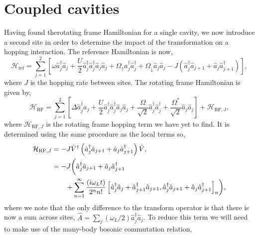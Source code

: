 \section{Coupled cavities}

Having found therotating frame Hamiltonian for a single cavity, we now introduce a second site in order to determine the impact of the transformation on a hopping interaction. The reference Hamiltonian is now,
\begin{equation}
	\mathcal{H}_{\mathrm{ref}} = \sum_{j=1}^{2}\left[\omega\hat{a}_{j}^{\dagger}\hat{a}_{j} + \frac{U}{2}\hat{a}_{j}^{\dagger}\hat{a}_{j}^{\dagger}\hat{a}_{j}\hat{a}_{j} + \Omega_{\uparrow}\hat{a}_{j}^{\dagger}\hat{a}_{j}^{\dagger} + \Omega_{\downarrow}\hat{a}_{j}\hat{a}_{j} - J\left(\hat{a}_{j}^{\dagger}\hat{a}_{j+1} + \hat{a}_{j}\hat{a}_{j+1}^{\dagger} \right) \right],
	\label{eq:rot23}
\end{equation}
where \(J\) is the hopping rate between sites. The rotating frame Hamiltonian is given by,
\begin{equation}
	\mathcal{H}_{\mathrm{RF}} = \sum_{j=1}^{2} \left[ \Delta\hat{a}_{j}^{\dagger}\hat{a}_{j} + \frac{U}{2}\hat{a}_{j}^{\dagger}\hat{a}_{j}^{\dagger}\hat{a}_{j}\hat{a}_{j} + \frac{\Omega}{\sqrt{2}}\hat{a}_{j}^{\dagger}\hat{a}_{j}^{\dagger} + \frac{\Omega^{*}}{\sqrt{2}}\hat{a}_{j}\hat{a}_{j} \right] + \mathcal{H}_{\mathrm{RF},J},
	\label{eq:rot24}
\end{equation}
where \(\mathcal{H}_{\mathrm{RF},J}\) is the rotating frame hopping term we have yet to find. It is determined using the same procedure as the local terms so,
\begin{align}
	\mathcal{H}_{\mathrm{RF},J} &= -J\hat{V}^{\dagger}\left(\hat{a}_{j}^{\dagger}\hat{a}_{j+1} + \hat{a}_{j}\hat{a}_{j+1}^{\dagger}\right)\hat{V}, \notag \\
	&= -J\biggl(\hat{a}_{j}^{\dagger}\hat{a}_{j+1} + \hat{a}_{j}\hat{a}_{j+1}^{\dagger} \notag \\ 
	&\qquad + \sum_{n=1}^{\infty} \frac{(i\omega_{L}t)}{2^{n}n!} \left[\hat{a}_{j}^{\dagger}\hat{a}_{j} + \hat{a}_{j+1}^{\dagger}\hat{a}_{j+1}, \hat{a}_{j}^{\dagger}\hat{a}_{j+1} + \hat{a}_{j}\hat{a}_{j+1}^{\dagger}\right]_{n}\biggr),
	\label{eq:rot25}
\end{align}
where we note that the only difference to the transform operator is that there is now a sum across sites, \(\hat{A} = \sum_{j} (\omega_{L}/2)\hat{a}_{j}^{\dagger}\hat{a}_{j}\). To reduce this term we will need to make use of the many-body bosonic commutation relation,
